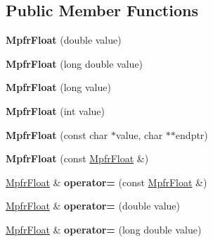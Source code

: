 \subsection*{Public Member Functions}
\begin{DoxyCompactItemize}
\item 
\mbox{\label{class_mpfr_float_a984f0977aff05c34e76d3cca363ec6df}} 
{\bfseries Mpfr\+Float} (double value)
\item 
\mbox{\label{class_mpfr_float_a63371995cb8866eb169af680e895ed88}} 
{\bfseries Mpfr\+Float} (long double value)
\item 
\mbox{\label{class_mpfr_float_a69249b46e1caba70b25b4abc1445ba4a}} 
{\bfseries Mpfr\+Float} (long value)
\item 
\mbox{\label{class_mpfr_float_ad6762394f10890f99bf50b18ec55d880}} 
{\bfseries Mpfr\+Float} (int value)
\item 
\mbox{\label{class_mpfr_float_ad90ad26ab3f0a8e135da609af00831c6}} 
{\bfseries Mpfr\+Float} (const char $\ast$value, char $\ast$$\ast$endptr)
\item 
\mbox{\label{class_mpfr_float_a7bf41a6f17f63864d80819c5248c91c4}} 
{\bfseries Mpfr\+Float} (const \hyperlink{class_mpfr_float}{Mpfr\+Float} \&)
\item 
\mbox{\label{class_mpfr_float_a09a52144dd7a440a564180879203e25d}} 
\hyperlink{class_mpfr_float}{Mpfr\+Float} \& {\bfseries operator=} (const \hyperlink{class_mpfr_float}{Mpfr\+Float} \&)
\item 
\mbox{\label{class_mpfr_float_aad79999a57423f0f5bccf0881f62a9d5}} 
\hyperlink{class_mpfr_float}{Mpfr\+Float} \& {\bfseries operator=} (double value)
\item 
\mbox{\label{class_mpfr_float_a64c3e6fc0355299036cae4ba237b4be8}} 
\hyperlink{class_mpfr_float}{Mpfr\+Float} \& {\bfseries operator=} (long double value)
\item 
\mbox{\label{class_mpfr_float_a1f47b014c02d9c8b379728397f476598}} 
$$
\end{DoxyCompactItemize}
